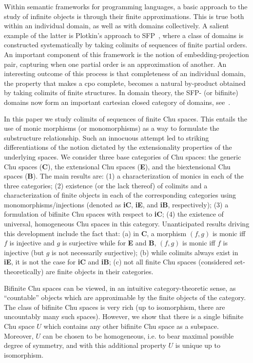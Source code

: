 \documentclass{LMCS}
\begin{document}
\noindent Within semantic frameworks for programming languages, a
basic approach to the study of infinite objects is through their
finite approximations. This is true both within an individual domain,
as well as with domains collectively. A salient example of the latter
is Plotkin's approach to SFP~\cite{plotkin}, where a class of domains
is constructed systematically by taking colimits of sequences of
finite partial orders.  An important component of this framework is
the notion of embedding-projection pair, capturing when one partial
order is an approximation of another.  An interesting outcome of this
process is that completeness of an individual domain, the property
that makes a cpo complete, becomes a natural by-product obtained by
taking colimits of finite structures.  In domain theory, the SFP- (or
bifinite) domains now form an important cartesian closed category of
domains, see~\cite{curien}.

In this paper we study colimits of sequences of finite Chu spaces.
This entails the use of monic morphisms (or monomorphisms) as a way to
formulate the substructure relationship.  Such an innocuous attempt
led to striking differentiations of the notion dictated by the
extensionality properties of the underlying spaces. We consider three
base categories of Chu spaces: the generic Chu spaces ({\bf C}), the
extensional Chu spaces ({\bf E}), and the biextensional Chu spaces
({\bf B}).  The main results are: (1) a characterization of monics in
each of the three categories; (2) existence (or the lack thereof) of
colimits and a characterization of finite objects in each of the
corresponding categories using monomorphisms/injections (denoted as
{\bf iC}, {\bf iE}, and {\bf iB}, respectively); (3) a formulation of
bifinite Chu spaces with respect to {\bf iC}; (4) the existence of
universal, homogeneous Chu spaces in this category.  Unanticipated
results driving this development include the fact that: (a) in {\bf
  C}, a morphism $(f,g)$ is monic iff $f$ is injective and $g$ is
surjective while for {\bf E} and {\bf B}, $(f,g)$ is monic iff $f$ is
injective (but $g$ is not necessarily surjective); (b) while colimits
always exist in {\bf iE}, it is not the case for {\bf iC} and {\bf
  iB}; (c) not all finite Chu spaces (considered set-theoretically)
are finite objects in their categories.

Bifinite Chu spaces can be viewed, in an intuitive category-theoretic
sense, as ``countable'' objects which are approximable by the finite
objects of the category. The class of bifinite Chu spaces is very rich
(up to isomorphism, there are uncountably many such spaces). However,
we show that there is a single bifinite Chu space $U$ which contains
any other bifinite Chu space as a subspace. Moreover, $U$ can be
chosen to be homogeneous, i.e. to bear maximal possible degree of
symmetry, and with this additional property $U$ is unique up to
isomorphism.
\end{document}
